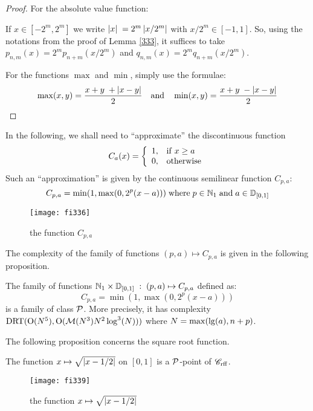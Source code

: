 \begin{proof} For the absolute value function:


\noindent 
If $x \in [-2^m , 2^m]$ we write 
$
\left|{x}\right|\;  = 2^m \left|{ x/2^m }\right| 
$
with $x/2^m \in [-1 , 1]$. So, using the notations from the proof of  Lemma \ref{333}, it suffices to take $p_{n,m}(x) = 2^m p_{n+m}(x/2^m)$ and $q_{n,m}(x) = 2^m q_{n+m}(x/2^m)$.

\noindent 
For the functions $\max$ and $\min$, simply use the formulae:
\[
\max(x,y) = \frac{x+y\; + \left|{x-y}\right|} {2}\quad  {\rm and} \quad  
\min (x,y) = \frac{x+y\; - \left|{x-y}\right|}{2} 
\]
\end{proof}

In the following, we shall need to ``approximate'' the discontinuous function
\[ 
C_a(x) = \left\{
\begin{array}{cl}
1, & {\rm if } \; x \geq a 
\\
0, & {\rm otherwise} 
\end{array}
\right.
\]
Such an ``approximation'' is given by the continuous semilinear function $C_{p,a}$:
\[
 C_{p,a} = \min(1, \max(0, 2^p(x - a))) \; {\rm where} \; p \in \mathbb {N}_1\; {\rm and}\; a \in \mathbb {D}_{[0,1]}
\] 
\begin{figure}[htbp] 
\begin{center}
\texttt{[image: fi336]}
\end{center}
\caption[representative curve of the function $C_{p,a}$]{\label{fi336} 
the function $C_{p,a}$} 
\end{figure} 

\noindent 
The complexity of the family of functions $(p,a) \mapsto C_{p,a}$ is given in the following proposition. 

\begin{proposition} \label{337}
The family of functions 
$
 \mathbb {N}_1 \times \mathbb {D}_{[0,1]} \;: \; (p,a) \mapsto C_{p,a}
$ 
defined as:
\[
C_{p,a} = \min(1,\max(0, 2^p(x - a)))
\] 
is a family of class ${\cal P}$. 
More precisely, it has complexity 
${\rm DRT}({\rm O}(N^5), {\rm O}({{{\cal M}}}(N^3) N^2 \log^3(N)))$ where $N = \max({\rm lg}(a), n+p)$.
\end{proposition}

The following proposition concerns the square root function.

\begin{proposition} \label{338}
The function $ x \mapsto \sqrt {\left|{ x - 1/2 }\right|} $ on $[0,1]$ is a 
${\cal P}$-point of ${{{\mathscr C}}_{\rm rff}}$.
\end{proposition}

\begin{figure}[htbp] 
\begin{center}
\texttt{[image: fi339]}
\end{center}
\caption[Curve of the function $\sqrt {\abs{ x - 1/2 }} $]{\label{fi339} 
the function $ x \mapsto \sqrt {\left|{ x - 1/2}\right|} $} 
\end{figure} 


